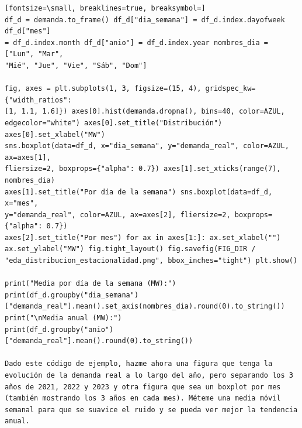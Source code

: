 \documentclass[12pt,a4paper,oneside]{book}
\begin{document}
\begin{iaprompt}
\begin{Verbatim}[fontsize=\small, breaklines=true, breaksymbol=]
df_d = demanda.to_frame() df_d["dia_semana"] = df_d.index.dayofweek df_d["mes"]
= df_d.index.month df_d["anio"] = df_d.index.year nombres_dia = ["Lun", "Mar",
"Mié", "Jue", "Vie", "Sáb", "Dom"]

fig, axes = plt.subplots(1, 3, figsize=(15, 4), gridspec_kw={"width_ratios":
[1, 1.1, 1.6]}) axes[0].hist(demanda.dropna(), bins=40, color=AZUL,
edgecolor="white") axes[0].set_title("Distribución") axes[0].set_xlabel("MW")
sns.boxplot(data=df_d, x="dia_semana", y="demanda_real", color=AZUL, ax=axes[1],
fliersize=2, boxprops={"alpha": 0.7}) axes[1].set_xticks(range(7), nombres_dia)
axes[1].set_title("Por día de la semana") sns.boxplot(data=df_d, x="mes",
y="demanda_real", color=AZUL, ax=axes[2], fliersize=2, boxprops={"alpha": 0.7})
axes[2].set_title("Por mes") for ax in axes[1:]: ax.set_xlabel("")
ax.set_ylabel("MW") fig.tight_layout() fig.savefig(FIG_DIR /
"eda_distribucion_estacionalidad.png", bbox_inches="tight") plt.show()

print("Media por día de la semana (MW):")
print(df_d.groupby("dia_semana")["demanda_real"].mean().set_axis(nombres_dia).round(0).to_string())
print("\nMedia anual (MW):")
print(df_d.groupby("anio")["demanda_real"].mean().round(0).to_string())

Dado este código de ejemplo, hazme ahora una figura que tenga la evolución de la demanda real a lo largo del año, pero separando los 3 años de 2021, 2022 y 2023 y otra figura que sea un boxplot por mes (también mostrando los 3 años en cada mes). Méteme una media móvil semanal para que se suavice el ruido y se pueda ver mejor la tendencia anual.
\end{Verbatim}
\end{iaprompt}
\end{document}
